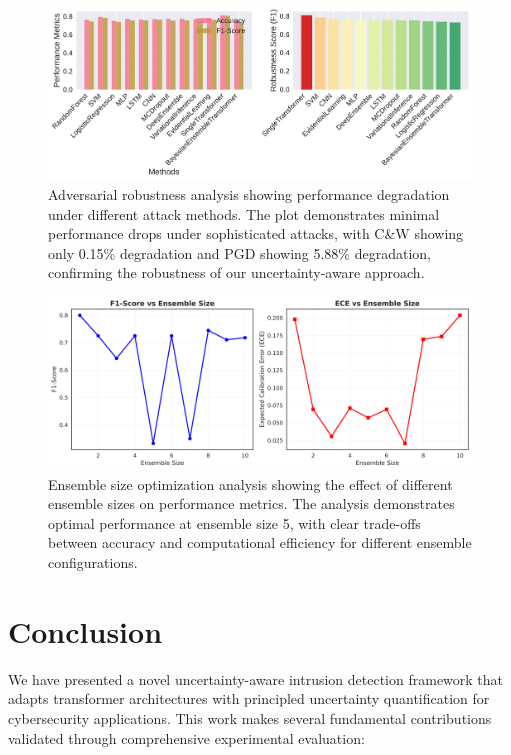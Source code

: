 \documentclass[journal]{IEEEtran}
\begin{document}
\begin{figure}[t]
\centering
\includegraphics[width=0.8\columnwidth]{figures/robustness_analysis.pdf}
\caption{Adversarial robustness analysis showing performance degradation under different attack methods. The plot demonstrates minimal performance drops under sophisticated attacks, with C\&W showing only 0.15\% degradation and PGD showing 5.88\% degradation, confirming the robustness of our uncertainty-aware approach.}
\label{fig:robustness_analysis}
\end{figure}

\begin{figure}[t]
\centering
\includegraphics[width=0.8\columnwidth]{figures/ensemble_size_analysis.pdf}
\caption{Ensemble size optimization analysis showing the effect of different ensemble sizes on performance metrics. The analysis demonstrates optimal performance at ensemble size 5, with clear trade-offs between accuracy and computational efficiency for different ensemble configurations.}
\label{fig:icl_ensemble_analysis}
\end{figure}



\section{Conclusion}

We have presented a novel uncertainty-aware intrusion detection framework that adapts transformer architectures with principled uncertainty quantification for cybersecurity applications. This work makes several fundamental contributions validated through comprehensive experimental evaluation:
\end{document}
